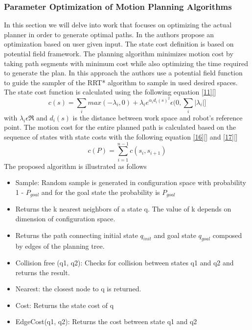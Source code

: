 \subsubsection{Parameter Optimization of Motion Planning Algorithms}
In this section we will delve into work that focuses on optimizing the actual planner in order to generate optimal paths. In \citet{Garcia2015} the authors propose an optimization based on user given input. The state cost definition is based on potential field framework. The planning algorithm minimizes motion cost by taking path segments with minimum cost while also optimizing the time required to generate the plan. In this approach the authors use a potential field function to guide the sampler of the RRT* algorithm to sample in used desired spaces. The state cost function is calculated using the following equation \eqref{11}[\citet{Garcia2015}]
\begin{equation}
\label{16}
c(s) = \sum_{i} max(-\lambda_{i},0 ) + \lambda_{i}e^{\alpha_{i}d_{i}(s)^2} \epsilon (0,\sum_{i}|\lambda_{i}|]
\end{equation}
with $\lambda_{i} \epsilon \Re$ and $d_{i}(s)$ is the distance between work space and robot's reference point. The motion cost for the entire planned path is calculated based on the sequence of states with state costs with the following equation \eqref{16}[\citet{Garcia2015}] and \eqref{17}[\citet{Garcia2015}]
\begin{equation}
\label{17}
c(P) = \sum_{i=1}^{n-1}c(s_{i},s_{i+1})
\end{equation}
The proposed algorithm is illustrated as follows
\begin{itemize}
\item Sample: Random sample is generated in configuration space with probability 1 - $P_{goal}$ and for the goal state the probability is $P_{goal}$
\item Returns the k nearest neighbors of a state q. The value of k depends on dimension of configuration space.
\item Returns the path connecting initial state $q_{init}$ and goal state $q_{goal}$ composed by edges of the planning tree.
\item Collision free (q1, q2): Checks for collision between states q1 and q2 and returns the result.
\item Nearest: the closest node to q is returned. 
\item Cost: Returns the state cost of q
\item EdgeCost(q1, q2): Returns the cost between state q1 and q2
\end{itemize}
